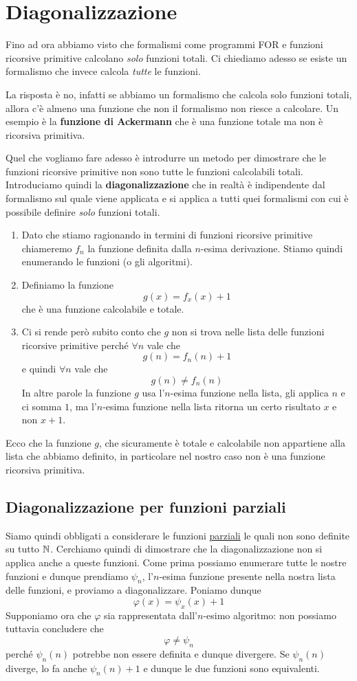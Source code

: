 \section{Diagonalizzazione}
Fino ad ora abbiamo visto che formalismi come programmi FOR
e funzioni ricorsive primitive calcolano \emph{solo} funzioni
totali. Ci chiediamo adesso se esiste un formalismo che invece
calcola \emph{tutte} le funzioni.

La risposta è no, infatti se abbiamo un formalismo che calcola
solo funzioni totali, allora c'è almeno una funzione che non
il formalismo non riesce a calcolare. Un esempio è la
\textbf{funzione di Ackermann} che è una funzione totale ma
non è ricorsiva primitiva.

Quel che vogliamo fare adesso è introdurre un metodo per
dimostrare che le funzioni ricorsive primitive non sono tutte
le funzioni calcolabili totali. Introduciamo quindi la
\textbf{diagonalizzazione} che in realtà è indipendente dal
formalismo sul quale viene applicata e si applica a tutti quei
formalismi con cui è possibile definire \emph{solo} funzioni
totali.
\begin{enumerate}
	\item Dato che stiamo ragionando in termini di funzioni
	      ricorsive primitive chiameremo $f_n$ la funzione
	      definita dalla $n$-esima derivazione. Stiamo quindi
	      enumerando le funzioni (o gli algoritmi).
	\item Definiamo la funzione
	      \[ g(x) = f_x(x) + 1 \]
	      che è una funzione calcolabile e totale.
	\item Ci si rende però
	      subito conto che $g$ non si trova nelle lista delle
	      funzioni ricorsive primitive perché $\forall n$ vale
	      che
	      \[ g(n) = f_n(n) + 1 \]
	      e quindi $\forall n$ vale che
	      \[ g(n) \neq f_n(n) \]
	      In altre parole la funzione $g$ usa l'$n$-esima
	      funzione nella lista, gli applica $n$ e ci somma $1$,
	      ma l'$n$-esima funzione nella lista ritorna un
	      certo risultato $x$ e non $x + 1$.
\end{enumerate}
Ecco che la funzione $g$, che sicuramente è totale e calcolabile
non appartiene alla lista che abbiamo definito, in particolare
nel nostro caso non è una funzione ricorsiva primitiva.

\subsection{Diagonalizzazione per funzioni parziali}
Siamo quindi obbligati a considerare le funzioni
\hyperref[def: funzione parziale]{parziali} le quali non sono
definite su tutto $\mathbb{N}$. Cerchiamo quindi di dimostrare che
la diagonalizzazione non si applica anche a queste funzioni.
Come prima possiamo enumerare tutte le nostre funzioni e
dunque prendiamo $\psi_n$, l'$n$-esima funzione presente nella
nostra lista delle funzioni, e proviamo a diagonalizzare.
Poniamo dunque
\[ \varphi (x) = \psi_x (x) + 1 \]
Supponiamo ora che $\varphi$ sia rappresentata dall'$n$-esimo
algoritmo: non possiamo tuttavia concludere che
\[ \varphi \neq \psi_n \]
perché $\psi_n(n)$ potrebbe non essere definita e dunque
divergere. Se $\psi_n(n)$ diverge, lo fa anche $\psi_n(n)+1$
e dunque le due funzioni sono equivalenti.

